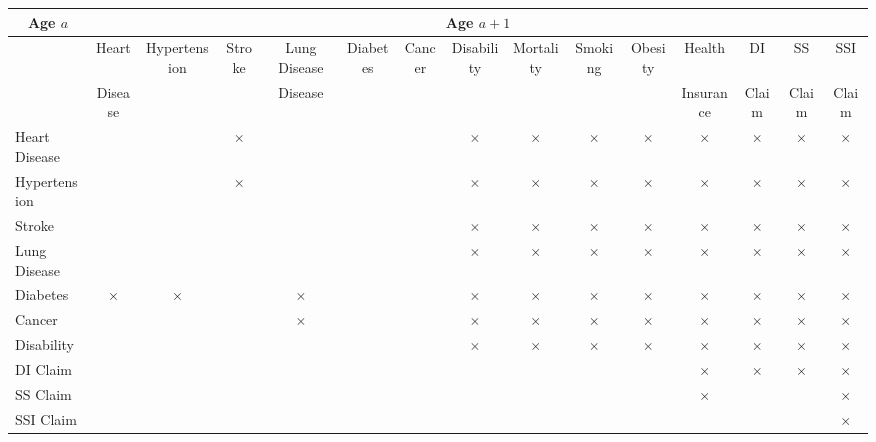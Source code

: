 \begin{tabular}{l|cccccccccccccc} \toprule
\multicolumn{1}{c}{Age $a$} & \multicolumn{14}{c}{Age $a+1$} \\ \midrule
  & Heart & Hypertension & Stroke & Lung Disease & Diabetes & Cancer & Disability & Mortality & Smoking & Obesity & Health  & DI  & SS  & SSI  \\
&  Disease &  &  & Disease & & & & &  &  & Insurance & Claim & Claim & Claim \\
Heart Disease & & & $\times$& & & &$\times$ &$\times$ &$\times$ &     $\times$        &  $\times$      &  $\times$  & $\times$ & $\times$\\
Hypertension  & & & $\times$ & & & &$\times$ &$\times$ &$\times$ &         $\times$    &   $\times$    & $\times$   & $\times$ & $\times$ \\
Stroke           & & & & & & &$\times$ &$\times$ &$\times$ &       $\times$       &     $\times$   &   $\times$  & $\times$ & $\times$ \\
Lung Disease & & & & & & &$\times$ &$\times$ & $\times$&       $\times$      &   $\times$     &   $\times$  &$\times$  & $\times$ \\
Diabetes       & $\times$ &$\times$  & &  $\times$ & & &$\times$ &$\times$ & $\times$&         $\times$    &   $\times$     &  $\times$   & $\times$ & $\times$ \\
Cancer         & & & &  $\times$ & & &$\times$ & $\times$& $\times$&     $\times$       &   $\times$      &   $\times$  & $\times$ & $\times$ \\
Disability     & & & & & & &$\times$ &$\times$ & $\times$&     $\times$       &    $\times$     &     $\times$  & $\times$ & $\times$  \\
\midrule
DI Claim      & & & & &  & & & & &            &    $\times$     & $\times$      & $\times$ & $\times$\\
SS Claim     & & & & & & & & &           &         &    $\times$  & & & $\times$\\
SSI Claim   & & & & &&  & & & &         &        &      & & $\times$ \\ \bottomrule
\end{tabular}